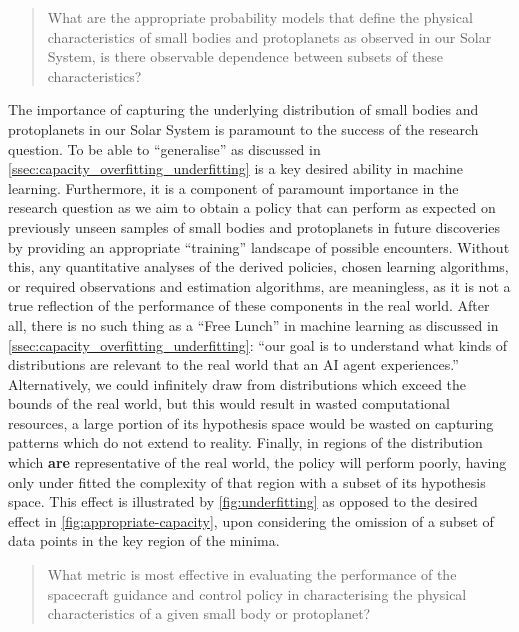 \begin{quote}
    What are the appropriate probability models that define the physical characteristics of small bodies and protoplanets as observed in our Solar System, is there observable dependence between subsets of these characteristics?
\end{quote}

The importance of capturing the underlying distribution of small bodies and protoplanets in our Solar System is paramount to the success of the research question. To be able to ``generalise'' as discussed in \autoref{ssec:capacity_overfitting_underfitting} is a key desired ability in machine learning. Furthermore, it is a component of paramount importance in the research question as we aim to obtain a policy that can perform as expected on previously unseen samples of small bodies and protoplanets in future discoveries by providing an appropriate ``training'' landscape of possible encounters. Without this, any quantitative analyses of the derived policies, chosen learning algorithms, or required observations and estimation algorithms, are meaningless, as it is not a true reflection of the performance of these components in the real world. After all, there is no such thing as a ``Free Lunch'' in machine learning as discussed in \autoref{ssec:capacity_overfitting_underfitting}: ``our goal is to understand what kinds of distributions are relevant to the real world that an \gls{AI} agent experiences.'' Alternatively, we could infinitely draw from distributions which exceed the bounds of the real world, but this would result in wasted computational resources, a large portion of its hypothesis space would be wasted on capturing patterns which do not extend to reality. Finally, in regions of the distribution which \textbf{are} representative of the real world, the policy will perform poorly, having only under fitted the complexity of that region with a subset of its hypothesis space. This effect is illustrated by \autoref{fig:underfitting} as opposed to the desired effect in \autoref{fig:appropriate-capacity}, upon considering the omission of a subset of data points in the key region of the minima.

\begin{quote}
    What metric is most effective in evaluating the performance of the spacecraft guidance and control policy in characterising the physical characteristics of a given small body or protoplanet?
\end{quote}




